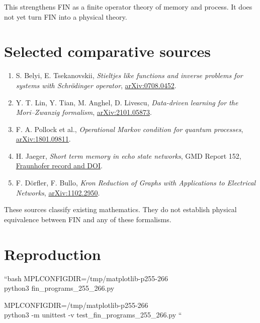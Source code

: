\documentclass[11pt,a4paper,openany]{report}
\begin{document}
This strengthens FIN as a finite operator theory of memory and process. It does not yet turn FIN into a physical theory.

\chapter{Selected comparative sources}

\begin{enumerate}
\item 
S. Belyi, E. Tsekanovskii, \emph{Stieltjes like functions and inverse problems for systems with Schrödinger operator}, \href{https://arxiv.org/abs/0708.0452}{arXiv:0708.0452}.

\item 
Y. T. Lin, Y. Tian, M. Anghel, D. Livescu, \emph{Data-driven learning for the Mori--Zwanzig formalism}, \href{https://arxiv.org/abs/2101.05873}{arXiv:2101.05873}.

\item 
F. A. Pollock et al., \emph{Operational Markov condition for quantum processes}, \href{https://arxiv.org/abs/1801.09811}{arXiv:1801.09811}.

\item 
H. Jaeger, \emph{Short term memory in echo state networks}, GMD Report 152, \href{https://publica.fraunhofer.de/entities/publication/9dfaead1-4dc0-4e3c-b89b-596f50f671c1}{Fraunhofer record and DOI}.

\item 
F. Dörfler, F. Bullo, \emph{Kron Reduction of Graphs with Applications to Electrical Networks}, \href{https://arxiv.org/abs/1102.2950}{arXiv:1102.2950}.

\end{enumerate}

These sources classify existing mathematics. They do not establish physical equivalence between FIN and any of these formalisms.

\chapter{Reproduction}

``bash MPLCONFIGDIR=/\allowbreak{}tmp/\allowbreak{}matplotlib-p255-266 \\
python3 fin\_programs\_255\_266.py

MPLCONFIGDIR=/\allowbreak{}tmp/\allowbreak{}matplotlib-p255-266 \\
python3 -m unittest -v test\_fin\_programs\_255\_266.py ``
\end{document}
